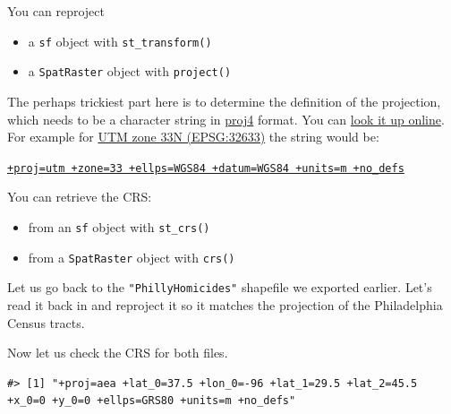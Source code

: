 \documentclass[
]{book}
\newenvironment{Shaded}{\begin{snugshade}}{\end{snugshade}}
\newcommand{\CommentTok}[1]{\textcolor[rgb]{0.56,0.35,0.01}{\textit{#1}}}
\newcommand{\FunctionTok}[1]{\textcolor[rgb]{0.13,0.29,0.53}{\textbf{#1}}}
\newcommand{\NormalTok}[1]{#1}
\newcommand{\SpecialCharTok}[1]{\textcolor[rgb]{0.81,0.36,0.00}{\textbf{#1}}}
\providecommand{\tightlist}{%
  \setlength{\itemsep}{0pt}\setlength{\parskip}{0pt}}
\begin{document}
You can reproject

\begin{itemize}
\tightlist
\item
  a \texttt{sf} object with \texttt{st\_transform()}\\
\item
  a \texttt{SpatRaster} object with \texttt{project()}
\end{itemize}

The perhaps trickiest part here is to determine the definition of the projection, which needs to be a character string in \href{http://trac.osgeo.org/proj/}{proj4} format. You can \href{http://www.spatialreference.org}{look it up online}. For example for \href{http://spatialreference.org/ref/epsg/wgs-84-utm-zone-33n/}{UTM zone 33N (EPSG:32633)} the string would be:

\href{http://spatialreference.org/ref/epsg/wgs-84-utm-zone-33n/proj4js/}{\texttt{+proj=utm\ +zone=33\ +ellps=WGS84\ +datum=WGS84\ +units=m\ +no\_defs}}

You can retrieve the CRS:

\begin{itemize}
\tightlist
\item
  from an \texttt{sf} object with \texttt{st\_crs()}
\item
  from a \texttt{SpatRaster} object with \texttt{crs()}
\end{itemize}

Let us go back to the \texttt{"PhillyHomicides"} shapefile we exported earlier. Let's read it back in and reproject it so it matches the projection of the Philadelphia Census tracts.

Now let us check the CRS for both files.

\begin{Shaded}
\end{Shaded}

\begin{verbatim}
#> [1] "+proj=aea +lat_0=37.5 +lon_0=-96 +lat_1=29.5 +lat_2=45.5 +x_0=0 +y_0=0 +ellps=GRS80 +units=m +no_defs"
\end{verbatim}
\end{document}
